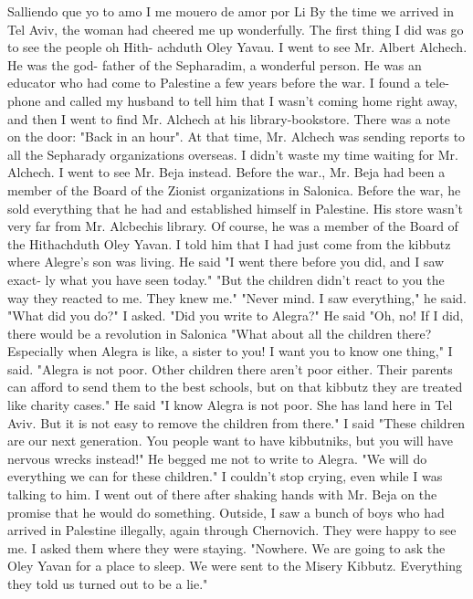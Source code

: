 Salliendo que yo to amo 
I me mouero de amor por Li 
By the time we arrived in Tel Aviv, the woman had cheered me up 
wonderfully. The first thing I did was go to see the people oh Hith-
achduth Oley Yavau. I went to see Mr. Albert Alchech. He was the god-
father of the Sepharadim, a wonderful person. He was an educator who 
had come to Palestine a few years before the war. I found a tele-
phone and called my husband to tell him that I wasn't coming home right 
away, and then I went to find Mr. Alchech at his library-bookstore. 
There was a note on the door: "Back in an hour". At that time, Mr. 
Alchech was sending reports to all the Sepharady organizations overseas. 
I didn't waste my time waiting for Mr. Alchech. I went to see Mr. 
Beja instead. Before the war., Mr. Beja had been a member of the Board 
of the Zionist organizations in Salonica. Before the war, he sold 
everything that he had and established himself in Palestine. His store 
wasn't very far from Mr. Alcbechis library. Of course, he was a member 
of the Board of the Hithachduth Oley Yavan. 
I told him that I had just come from the kibbutz where Alegre's 
son was living. He said "I went there before you did, and I saw exact-
ly what you have seen today." 
"But the children didn’t react to you the way they reacted to me. 
They knew me." 
"Never mind. I saw everything," he said. 
"What did you do?" I asked. "Did you write to Alegra?" 
He said "Oh, no! If I did, there would be a revolution in Salonica 
"What about all the children there? Especially when Alegra is like, 
a sister to you! I want you to know one thing," I said. "Alegra is not
poor. Other children there aren't poor either. Their parents can afford to send them to the best schools, but on that kibbutz they are treated like charity cases." 
He said "I know Alegra is not poor. She has land here in Tel Aviv. 
But it is not easy to remove the children from there." 
I said "These children are our next generation. You people want 
to have kibbutniks, but you will have nervous wrecks instead!" 
He begged me not to write to Alegra. "We will do everything we can 
for these children." 
I couldn't stop crying, even while I was talking to him. I went 
out of there after shaking hands with Mr. Beja on the promise that he 
would do something. Outside, I saw a bunch of boys who had arrived 
in Palestine illegally, again through Chernovich. They were happy to 
see me. I asked them where they were staying. "Nowhere. We are going 
to ask the Oley Yavan for a place to sleep. We were sent to the Misery 
Kibbutz. Everything they told us turned out to be a lie." 

